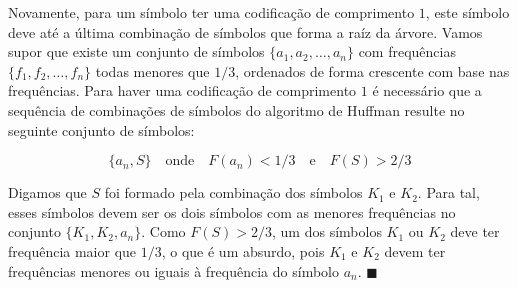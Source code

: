 \documentclass[12pt, a4paper]{article}
\begin{document}
Novamente, para um símbolo ter uma codificação de comprimento $1$, este símbolo deve  até a última combinação de símbolos que forma a raíz da árvore. Vamos supor que existe um conjunto de símbolos $\{a_1, a_2, \ldots,a_n\}$ com frequências $\{f_1, f_2, \ldots, f_n\}$ todas menores que $1/3$, ordenados de forma crescente com base nas frequências. Para haver uma codificação de comprimento $1$ é necessário que a sequência de combinações de símbolos do algoritmo de Huffman resulte no seguinte conjunto de símbolos:

\[ \{a_n, S\} \quad \textrm{onde} \quad F(a_n) < 1/3 \quad \textrm{e} \quad F(S) > 2/3 \]

Digamos que $S$ foi formado pela combinação dos símbolos $K_1$ e $K_2$. Para tal, esses símbolos devem ser os dois símbolos com as menores frequências no conjunto $\{K_1, K_2, a_n\}$. Como $F(S)>2/3$, um dos símbolos $K_1$ ou $K_2$ deve ter frequência maior que $1/3$, o que é um absurdo, pois $K_1$ e $K_2$ devem ter frequências menores ou iguais à frequência do símbolo $a_n$. $\blacksquare$
\end{document}
